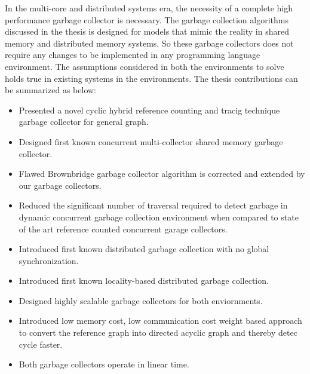 In the multi-core and distributed systems era, the necessity of a complete high performance garbage collector is necessary. The garbage collection algorithms discussed in the thesis is designed for models that mimic the reality in shared memory and distributed memory systems. So these garbage collectors does not require any changes to be implemented in any programming language environment. The assumptions considered in both the environments to solve holds true in existing systems in the environments. The thesis contributions can be summarized as below:
\begin{itemize}
		\item Presented a novel cyclic hybrid reference counting and tracig technique garbage collector for general graph.
		\item Designed first known concurrent multi-collector shared memory garbage collector.
		\item Flawed Brownbridge garbage collector algorithm is corrected and extended by our garbage collectors.
		\item Reduced the significant number of traversal required to detect garbage in dynamic concurrent garbage collection environment when compared to state of the art reference counted concurrent garage collectors.
		\item Introduced first known distributed garbage collection with no global synchronization.
		\item Introduced first known locality-based distributed garbage collection.
		\item Designed highly scalable garbage collectors for both enviornments.
		\item Introduced low memory cost, low communication cost weight based approach to convert the reference graph into directed acyclic graph and thereby detec cycle faster.
		\item Both garbage collectors operate in linear time.
\end{itemize}
